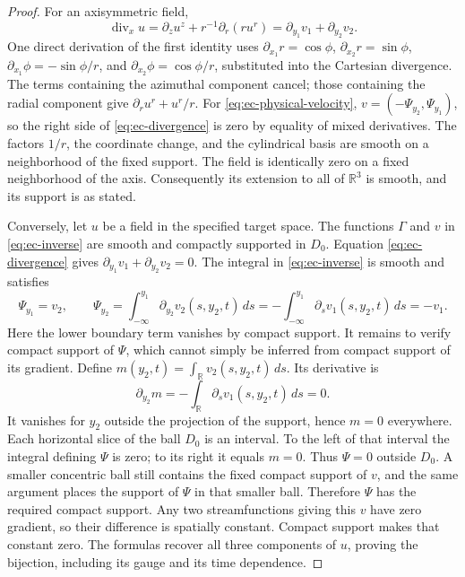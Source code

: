 \begin{proof}
For an axisymmetric field,
\begin{equation}
 \operatorname{div}_x u
 =\partial_z u^z+r^{-1}\partial_r(r u^r)
 =\partial_{y_1}v_1+\partial_{y_2}v_2.
 \label{eq:ec-divergence}
\end{equation}
One direct derivation of the first identity uses
\(\partial_{x_1}r=\cos\phi\),
\(\partial_{x_2}r=\sin\phi\),
\(\partial_{x_1}\phi=-\sin\phi/r\), and
\(\partial_{x_2}\phi=\cos\phi/r\), substituted into the Cartesian
divergence.  The terms containing the azimuthal component cancel; those
containing the radial component give \(\partial_r u^r+u^r/r\).
For \eqref{eq:ec-physical-velocity}, \(v=(-\Psi_{y_2},\Psi_{y_1})\), so
the right side of \eqref{eq:ec-divergence} is zero by equality of mixed
derivatives.  The factors \(1/r\), the coordinate change, and the
cylindrical basis are smooth on a neighborhood of the fixed support.
The field is identically zero on a fixed neighborhood of the axis.
Consequently its extension to all of \(\mathbb R^3\) is smooth, and its
support is as stated.

Conversely, let \(u\) be a field in the specified target space.  The
functions \(\Gamma\) and \(v\) in \eqref{eq:ec-inverse} are smooth and
compactly supported in \(D_0\).  Equation \eqref{eq:ec-divergence} gives
\(\partial_{y_1}v_1+\partial_{y_2}v_2=0\).  The integral in
\eqref{eq:ec-inverse} is smooth and satisfies
\[
 \Psi_{y_1}=v_2,\qquad
 \Psi_{y_2}=\int_{-\infty}^{y_1}\partial_{y_2}v_2(s,y_2,t)\,ds
 =-\int_{-\infty}^{y_1}\partial_s v_1(s,y_2,t)\,ds=-v_1.
\]
Here the lower boundary term vanishes by compact support.
It remains to verify compact support of \(\Psi\), which cannot simply
be inferred from compact support of its gradient.  Define
\(m(y_2,t)=\int_{\mathbb R}v_2(s,y_2,t)\,ds\).  Its derivative is
\[
 \partial_{y_2}m=-\int_{\mathbb R}\partial_s v_1(s,y_2,t)\,ds=0.
\]
It vanishes for \(y_2\) outside the projection of the support, hence
\(m=0\) everywhere.  Each horizontal slice of the ball \(D_0\) is
an interval.  To the left of that interval the integral defining \(\Psi\)
is zero; to its right it equals \(m=0\).  Thus \(\Psi=0\) outside
\(D_0\).  A smaller concentric ball still contains the fixed compact
support of \(v\), and the same argument places the support of \(\Psi\)
in that smaller ball.  Therefore \(\Psi\) has the required compact support.
Any two streamfunctions giving this \(v\) have zero gradient, so their
difference is spatially constant.  Compact support makes that constant
zero.  The formulas recover all three components of \(u\), proving the
bijection, including its gauge and its time dependence.
\end{proof}

